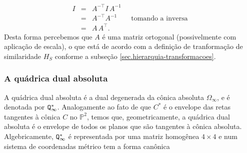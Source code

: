 \begin{equation*}
\begin{array}{rcl}
I&=&A^{-\top}I\,A^{-1}\\
&=&A^{-\top}A^{-1}\qquad\text{tomando a inversa}\\
&=&A\,A^\top.
\end{array}
\end{equation*}
Desta forma percebemos que $A$ é uma matriz ortogonal (possivelmente com aplicação de escala), o que está de acordo com a definição de tranformação de similaridade $H_S$ conforme a subseção \ref{sec.hierarquia-transformacoes}.

\subsubsection{A quádrica dual absoluta}\label{sec.quadrica-dual-abs}
A quádrica dual absoluta é a dual degenerada da cônica absoluta $\Omega_\infty$, e é denotada por 
${\tt Q}^*_\infty$. Analogamente ao fato de que $C^*$ é o envelope das retas tangentes à cônica $C$ no ${\mathbb{P}}^2$, temos que, geometricamente, a quádrica dual absoluta é o envelope de todos os planos que são tangentes à cônica absoluta. Algebricamente, 
${\tt Q}^*_\infty$ é representada por uma matriz homogênea $4\times4$ e num sistema de coordenadas métrico tem a forma canônica

